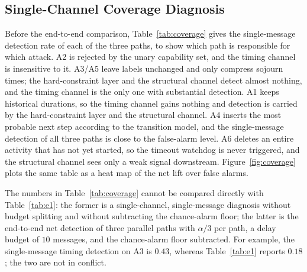 \documentclass[manuscript,screen,review]{acmart}
\begin{document}
\subsection{Single-Channel Coverage Diagnosis}
\label{sec:diag}

Before the end-to-end comparison, Table~\ref{tab:coverage} gives the single-message detection rate of each of the three paths, to show which path is responsible for which attack. {A2} is rejected by the unary capability set, and the timing channel is insensitive to it. {A3}/{A5} leave labels unchanged and only compress sojourn times; the hard-constraint layer and the structural channel detect almost nothing, and the timing channel is the only one with substantial detection. {A1} keeps historical durations, so the timing channel gains nothing and detection is carried by the hard-constraint layer and the structural channel. {A4} inserts the most probable next step according to the transition model, and the single-message detection of all three paths is close to the false-alarm level. {A6} deletes an entire activity that has not yet started, so the timeout watchdog is never triggered, and the structural channel sees only a weak signal downstream. Figure~\ref{fig:coverage} plots the same table as a heat map of the net lift over false alarms.

The numbers in Table~\ref{tab:coverage} cannot be compared directly with Table~\ref{tab:e1}: the former is a single-channel, single-message diagnosis without budget splitting and without subtracting the chance-alarm floor; the latter is the end-to-end net detection of three parallel paths with $\alpha/3$ per path, a delay budget of $10$ messages, and the chance-alarm floor subtracted. For example, the single-message timing detection on {A3} is $0.43$, whereas Table~\ref{tab:e1} reports $0.18$; the two are not in conflict.
\end{document}
